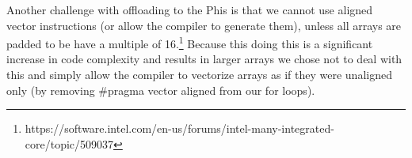 Another challenge with offloading to the Phis is that we cannot use aligned vector instructions (or allow the compiler to generate them), unless all arrays are padded to be have a multiple of 16.\footnote{https://software.intel.com/en-us/forums/intel-many-integrated-core/topic/509037} Because this doing this is a significant increase in code complexity and results in larger arrays we chose not to deal with this and simply allow the compiler to vectorize arrays as if they were unaligned only (by removing \#pragma vector aligned from our for loops).